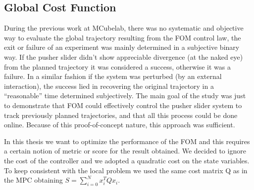 \documentclass[12,twoside]{TFG-GM}
\theoremstyle{definition}
\theoremstyle{remark}
\begin{document}
\subsection{Global Cost Function}
\label{subsec:costfunc}
During the previous work at MCubelab, there was no systematic and objective way to evaluate the global trajectory resulting from the FOM control law, the exit or failure of an experiment was mainly determined in a subjective binary way. If the pusher slider didn’t show appreciable divergence (at the naked eye) from the planned trajectory it was considered a success, otherwise it was a failure. In a similar fashion if the system was perturbed (by an external interaction), the success lied in recovering the original trajectory in a “reasonable” time determined subjectively. The main goal of the study was just to demonstrate that FOM could effectively control the pusher slider system to track previously planned trajectories, and that all this process could be done online. Because of this proof-of-concept nature, this approach was sufficient.

In this thesis we want to optimize the performance of the FOM and this requires a certain notion of metric or score for the result obtained. We decided to ignore the cost of the controller and we adopted a quadratic cost on the state variables. To keep consistent with the local problem we used the same cost matrix Q as in the MPC obtaining $S = \sum\limits_{i = 0}^{N}{x_{i}^{T} Q x_i}$.
\end{document}
